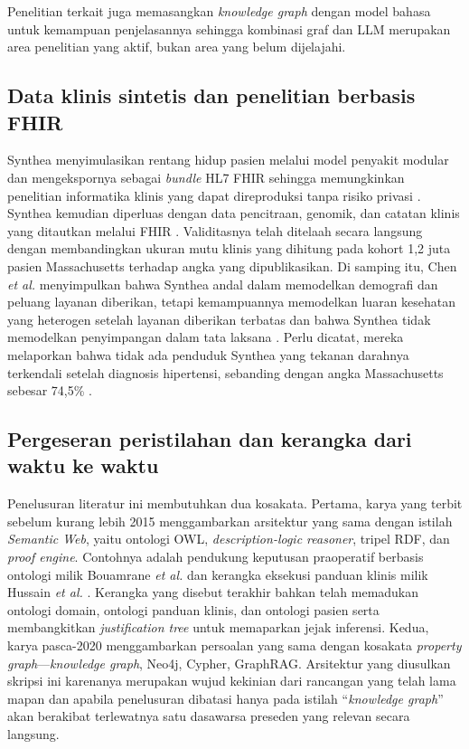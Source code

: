 Penelitian terkait juga memasangkan \emph{knowledge graph} dengan model bahasa untuk
kemampuan penjelasannya \cite{park2025} sehingga kombinasi graf dan LLM merupakan
area penelitian yang aktif, bukan area yang belum dijelajahi.

\subsection{Data klinis sintetis dan penelitian berbasis FHIR}
Synthea menyimulasikan rentang hidup pasien melalui model penyakit modular dan mengekspornya
sebagai \emph{bundle} HL7 FHIR sehingga memungkinkan penelitian informatika klinis yang
dapat direproduksi tanpa risiko privasi \cite{walonoski2017}. Synthea kemudian diperluas
dengan data pencitraan, genomik, dan catatan klinis yang ditautkan melalui FHIR
\cite{walonoski2022}. Validitasnya telah ditelaah secara langsung dengan
membandingkan ukuran mutu klinis yang dihitung pada kohort 1,2 juta pasien Massachusetts
terhadap angka yang dipublikasikan. Di samping itu, Chen \textit{et al.} menyimpulkan bahwa Synthea
andal dalam memodelkan demografi dan peluang layanan diberikan, tetapi
kemampuannya memodelkan luaran kesehatan yang heterogen setelah layanan
diberikan terbatas dan bahwa Synthea tidak memodelkan penyimpangan dalam
tata laksana \cite{chen2019}. Perlu dicatat, mereka melaporkan bahwa
tidak ada penduduk Synthea yang tekanan darahnya terkendali setelah diagnosis
hipertensi, sebanding dengan angka Massachusetts sebesar 74,5\% \cite{chen2019}.

\subsection{Pergeseran peristilahan dan kerangka dari waktu ke waktu}
Penelusuran literatur ini membutuhkan dua kosakata. Pertama, karya yang terbit sebelum kurang lebih 2015
menggambarkan arsitektur yang sama dengan istilah \emph{Semantic Web}, yaitu ontologi OWL,
\emph{description-logic reasoner}, tripel RDF, dan \emph{proof engine}. Contohnya adalah
pendukung keputusan praoperatif berbasis ontologi milik Bouamrane \textit{et al.}
\cite{bouamrane2011} dan kerangka eksekusi panduan klinis milik Hussain
\textit{et al.} \cite{hussain2007}. Kerangka yang disebut terakhir bahkan telah memadukan
ontologi domain, ontologi panduan klinis, dan ontologi pasien serta membangkitkan
\emph{justification tree} untuk memaparkan jejak inferensi. Kedua, karya pasca-2020 menggambarkan
persoalan yang sama dengan kosakata \emph{property graph}---\emph{knowledge graph}, Neo4j,
Cypher, GraphRAG. Arsitektur yang diusulkan skripsi ini karenanya merupakan wujud kekinian dari
rancangan yang telah lama mapan dan apabila penelusuran dibatasi hanya pada istilah ``\emph{knowledge
graph}'' akan berakibat terlewatnya satu dasawarsa preseden yang relevan secara langsung.

